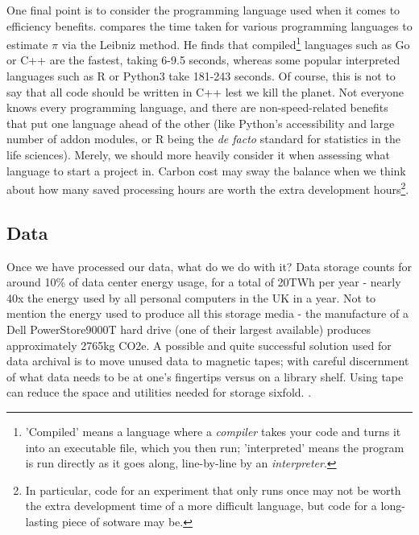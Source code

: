 \documentclass{article}
\begin{document}
One final point is to consider the programming language used when it comes to efficiency benefits. \citet{heer2018speed} compares the time taken for various programming languages to estimate $\pi$ via the Leibniz method. He finds that compiled\footnote{'Compiled' means a language where a \emph{compiler} takes your code and turns it into an executable file, which you then run; 'interpreted' means the program is run directly as it goes along, line-by-line by an \emph{interpreter}.} languages such as Go or C++ are the fastest, taking 6-9.5 seconds, whereas some popular interpreted languages such as R or Python3 take 181-243 seconds. Of course, this is not to say that all code should be written in C++ lest we kill the planet. Not everyone knows every programming language, and there are non-speed-related benefits that put one language ahead of the other (like Python's accessibility and large number of addon modules, or R being the \textit{de facto} standard for statistics in the life sciences). Merely, we should more heavily consider it when assessing what language to start a project in. Carbon cost may sway the balance when we think about how many saved processing hours are worth the extra development hours\footnote{In particular, code for an experiment that only runs once may not be worth the extra development time of a more difficult language, but code for a long-lasting piece of sotware may be.}. \newline


\subsection{Data}
Once we have processed our data, what do we do with it? Data storage counts for around 10\% of data center energy usage, for a total of 20TWh per year \citep{shehabi2016united} - nearly 40x the energy used by all personal computers in the UK in a year.  \citep{waters2019energy} Not to mention the energy used to produce all this storage media - the manufacture of a Dell PowerStore9000T hard drive (one of their largest available) produces approximately 2765kg CO2e. \citep{dell2021powerstore} A possible and quite successful solution used for data archival is to move unused data to magnetic tapes; with careful discernment of what data needs to be at one's fingertips versus on a library shelf. Using tape can reduce the space and utilities needed for storage sixfold. \citep{moore2007disk}. \newline
\end{document}
